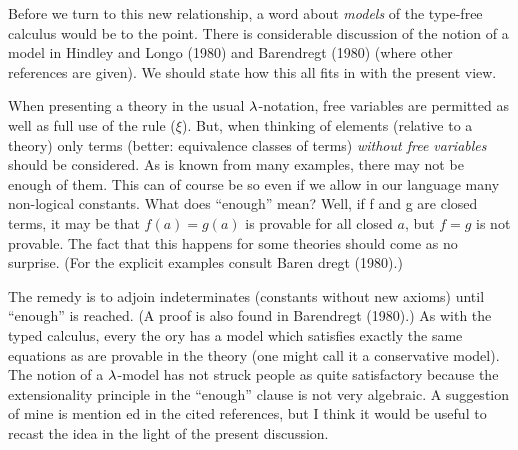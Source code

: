 Before we turn to this new relationship, a word about {\it models} of the type-free calculus would be to the point. There is considerable discussion of the notion of a model in Hindley and Longo (1980) and Barendregt (1980) (where other references are given). We should state how this all fits in with the present view.

When presenting a theory in the usual $\lambda$-notation, free variables are permitted as well as full use of the rule ($\xi$). But, when thinking of elements (relative to a theory) only terms (better: equivalence classes of terms) {\it without free variables} should be considered. As is known from many examples, there may not be enough of them. This can of course be so even if we
allow in our language many non-logical constants. What does
``enough'' mean? Well, if f and g are closed terms, it may be
that $f(a) = g(a)$ is provable for all closed $a$, but $f = g$ is not provable. The fact that this happens for some theories should come as no surprise. (For the explicit examples consult Baren dregt (1980).)

The remedy is to adjoin indeterminates (constants without
new axioms) until ``enough'' is reached. (A proof is also found
in Barendregt (1980).) As with the typed calculus, every the ory has a model which satisfies exactly the same equations as
are provable in the theory (one might call it a conservative
model).
The notion of a $\lambda$-model has not struck people as quite satisfactory because the extensionality principle in the ``enough'' clause is not very algebraic. A suggestion of mine is mention ed in the cited references, but I think it would be useful to recast the idea in the light of the present discussion.

